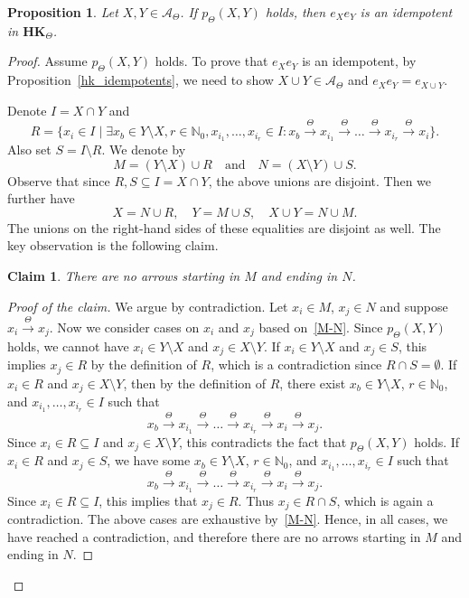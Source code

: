 \documentclass[pdflatex,sn-mathphys-num]{sn-jnl}
\newcommand{\hk}{\mathbf{HK}_{\Theta}}
\newcommand{\tot}{\overset{\Theta}{\to}}
\newtheorem{proposition}[theorem]{Proposition}
\newtheorem*{claim}{Claim}
\theoremstyle{definition}
\theoremstyle{remark}
\begin{document}
\begin{proposition}\label{prop2}
   Let $X, Y \in \mathcal{A}_{\Theta}$.
   If $p_{\Theta}(X, Y)$ holds, then $e_X e_Y$ is an idempotent in $\hk$.
\end{proposition}

\begin{proof}
   Assume $p_{\Theta}(X, Y)$ holds.
   To prove that $e_X e_Y$ is an idempotent, by Proposition~\ref{hk_idempotents}, we need to show $X \cup Y \in \mathcal{A}_{\Theta}$ and $e_X e_Y = e_{X \cup Y}$.
   
   Denote $I = X \cap Y$ and
   \[
   R = \{x_i \in I \mid \exists x_b \in Y \setminus X, r \in \mathbb{N}_0,
   x_{i_1}, \dots, x_{i_r} \in I
   : x_b \tot x_{i_1} \tot \dots \tot x_{i_r} \tot x_i\}.
   \]
   Also set $S = I \setminus R$.
   We denote by
   \begin{equation}\label{M-N}
      M = (Y \setminus X) \cup R \quad \text{and} \quad N = (X \setminus Y) \cup S. 
   \end{equation}
   Observe that since $R, S \subseteq I = X \cap Y$, the above unions are disjoint.
   Then we further have 
   \begin{equation}\label{xy_decomp}
      X = N \cup R, \quad Y = M \cup S, \quad X \cup Y = N \cup M.
   \end{equation}
   The unions on the right-hand sides of these equalities are disjoint as well.
   The key observation is the following claim.
   \begin{claim}
      There are no arrows starting in $M$ and ending in $N$.
   \end{claim}

   \begin{proof}[Proof of the claim]
      We argue by contradiction.
      Let $x_i \in M$, $x_j \in N$ and suppose $x_i \tot x_j$.
      Now we consider cases on $x_i$ and $x_j$ based on~\eqref{M-N}.
      Since $p_{\Theta}(X, Y)$ holds, we cannot have $x_i \in Y \setminus X$ and $x_j \in X \setminus Y$.
      If $x_i \in Y \setminus X$ and $x_j \in S$, this implies $x_j \in R$ by the definition of $R$, which is a contradiction since $R \cap S = \emptyset$.
      If $x_i \in R$ and $x_j \in X \setminus Y$, then by the definition of $R$, there exist $x_b \in Y \setminus X$, $r \in \mathbb{N}_0$, and $x_{i_1}, \dots, x_{i_r} \in I$ such that
      \[
      x_b \tot x_{i_1} \tot \dots \tot x_{i_r} \tot x_i \tot x_j.
      \]
      Since $x_i \in R \subseteq I$ and $x_j \in X \setminus Y$, this contradicts the fact that $p_{\Theta}(X, Y)$ holds.
      If $x_i \in R$ and $x_j \in S$, we have some $x_b \in Y \setminus X$, $r \in \mathbb{N}_0$, and $x_{i_1}, \dots, x_{i_r} \in I$ such that 
      \[
      x_b \tot x_{i_1} \tot \dots \tot x_{i_r} \tot x_i \tot x_j.
      \]
      Since $x_i \in R \subseteq I$, this implies that $x_j \in R$.
      Thus $x_j \in R \cap S$, which is again a contradiction.
      The above cases are exhaustive by~\eqref{M-N}.
      Hence, in all cases, we have reached a contradiction, and therefore there are no arrows starting in $M$ and ending in $N$. 
   \end{proof}


\end{proof}
\end{document}
